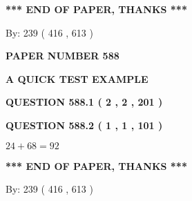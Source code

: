 \documentclass[12pt]{article}
\begin{document}
   
 \vspace{0.2in}
 
   
   
   
   
\vspace{1.0in} 
{\textbf{\large{ *** END OF PAPER, THANKS *** }}} 
   
   
\hspace{1.0in} By: 
 239 ( 416 ,  613 )
   
   
   
   
\newpage 
\setcounter{page}{ 
   588001 } 
   
   
   
   
 {\textbf{ \Large{ PAPER NUMBER  588  }}}
   
   
\vspace{0.2in}
   
   
   
   
   
   
 \vspace{0.2in}
{\LARGE {\textbf{ A QUICK TEST EXAMPLE}}}
   
   
  
\vspace{0.2in}
  
{\textbf{\Large{QUESTION
588.1 
 ( 2 , 2 , 201 )
}}}
  
  
  
\vspace{0.2in}
  
{\textbf{\Large{QUESTION
588.2 
 ( 1 , 1 , 101 )
}}}
  
  
 
 

$ %
24 +  %
68=   %
92$
 
 
   
   
 \vspace{0.2in}
 
   
   
   
   
\vspace{1.0in} 
{\textbf{\large{ *** END OF PAPER, THANKS *** }}} 
   
   
\hspace{1.0in} By: 
 239 ( 416 ,  613 )
   
   
   
   
\newpage 
\setcounter{page}{ 
   589001 } 
   
   
   
\end{document}
